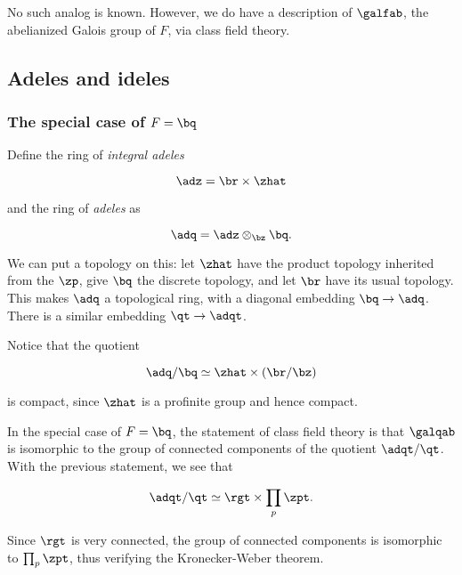 No such analog is known. However, we do have a description of $\galfab$, the
abelianized Galois group of $F$, via class field theory.

\subsection{Adeles and ideles}
\label{sec:adeles-ideles}

\subsubsection{The special case of $F=\bq$}

Define the ring of \textit{integral adeles}

\[ \adz = \br \times \zhat \]

and the ring of \textit{adeles} as

\[ \adq = \adz \otimes_\bz \bq. \]

We can put a topology on this: let $\zhat$ have the product topology inherited
from the $\zp$, give $\bq$ the discrete topology, and let $\br$ have its usual
topology. This makes $\adq$ a topological ring, with a diagonal embedding
$\bq\to\adq$. There is a similar embedding $\qt \to \adqt$.

Notice that the quotient

\[ \adq/\bq \simeq \zhat \times (\br/\bz) \]

is compact, since $\zhat$ is a profinite group and hence compact.

In the special case of $F=\bq$, the statement of class field theory is that
$\galqab$ is isomorphic to the group of connected components of the quotient
$\adqt/\qt$. With the previous statement, we see that

\[ \adqt/
  \qt
  \simeq \rgt \times \prod_p \zpt. \]

Since $\rgt$ is very connected, the group of connected components is isomorphic
to $\prod_p \zpt$, thus verifying the Kronecker-Weber theorem.


